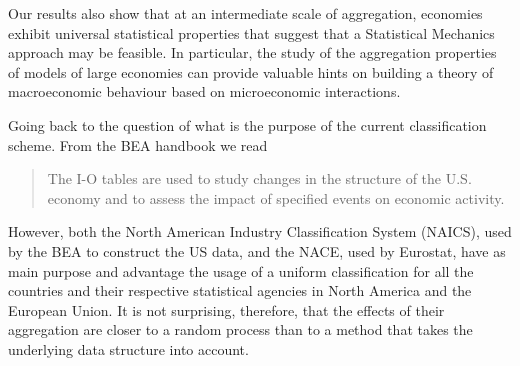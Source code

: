Our results also show that at an intermediate scale of aggregation,
economies exhibit universal statistical properties that suggest that a
Statistical Mechanics approach may be feasible. In particular, the
study of the aggregation properties of models of large economies can
provide valuable hints on building a theory of macroeconomic
behaviour based on microeconomic interactions.

Going back to the question of what is the purpose of the current
classification scheme. From the BEA handbook we read

\begin{quote}
  The I-O tables are used to study changes in the structure of the
  U.S. economy and to assess the impact of specified events on
  economic activity.
\end{quote}

However, both the North American Industry Classification System
(NAICS), used by the BEA to construct the US data, and the NACE, used
by Eurostat, have as main purpose and advantage the usage of a uniform
classification for all the countries and their respective statistical
agencies in North America and the European Union. It is not surprising,
therefore, that the effects of their aggregation are closer to a
random process than to a method that takes the underlying data structure into
account.
